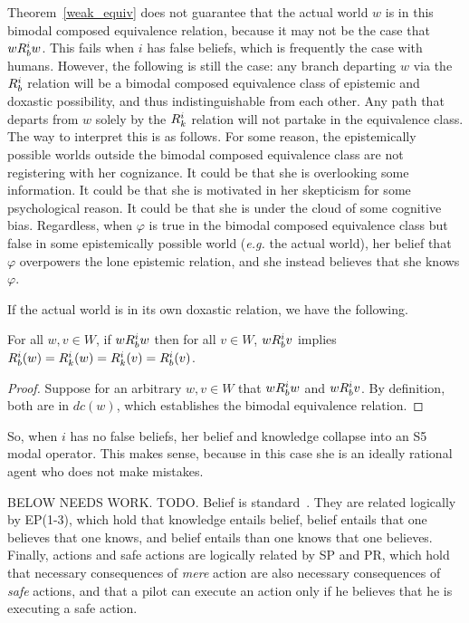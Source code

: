 Theorem~\ref{weak_equiv} does not guarantee that the actual world $w$ is in this bimodal composed equivalence relation, because it may not be the case that $wR_{b}^iw$. This fails when $i$ has false beliefs, which is frequently the case with humans. However, the following is still the case: any branch departing $w$ via the $R_{b}^i$ relation will be a bimodal composed equivalence class of epistemic and doxastic possibility, and thus indistinguishable from each other. Any path that departs from $w$ solely by the $R_{k}^i$ relation will not partake in the equivalence class. The way to interpret this is as follows. For some reason, the epistemically possible worlds outside the bimodal composed equivalence class are not registering with her cognizance. It could be that she is overlooking some information. It could be that she is motivated in her skepticism for some psychological reason. It could be that she is under the cloud of some cognitive bias. Regardless, when $\varphi$ is true in the bimodal composed equivalence class but false in some epistemically possible world (\emph{e.g.} the actual world), her belief that $\varphi$ overpowers the lone epistemic relation, and she instead believes that she knows $\varphi$.

If the actual world is in its own doxastic relation, we have the following. 

\begin{theorem}
	For all $w,v \in W$, if $wR_{b}^i w$ then for all $v \in W$, $wR_{b}^iv$ implies $R_{b}^i(w) = R_{k}^i(w) = R_{k}^i(v) = R_{b}^i(v)$.
\end{theorem}
\begin{proof}
	Suppose for an arbitrary $w,v\in W$ that $wR_{b}^iw$ and $wR_{b}^iv$. By definition, both are in $dc(w)$, which establishes the bimodal equivalence relation.
\end{proof}

So, when $i$ has no false beliefs, her belief and knowledge collapse into an S5 modal operator. This makes sense, because in this case she is an ideally rational agent who does not make mistakes. 


BELOW NEEDS WORK.
TODO. Belief is standard~\cite{FHMV}. They are related logically by EP(1-3), which hold that knowledge entails belief, belief entails that one believes that one knows, and belief entails than one knows that one believes. Finally, actions and safe actions are logically related by SP and PR, which hold that necessary consequences of \emph{mere} action are also necessary consequences of \emph{safe} actions, and that a pilot can execute an action only if he believes that he is executing a safe action. 

